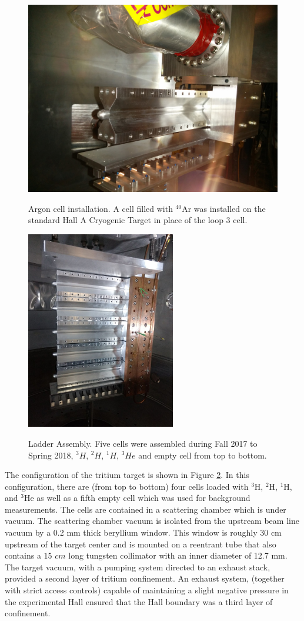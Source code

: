 \documentclass[final,5p,times,twocolumn]{elsarticle}
\begin{document}
\begin{figure}[htbp]
	\centering
	\includegraphics[width=6.5 cm]{images/Ar-cell.jpg}\\
	\caption{Argon cell installation. A cell filled with $^{40}$Ar was installed on the standard Hall A Cryogenic Target in place of the loop 3 cell.}
	\label{argon}
\end{figure}

\begin{figure}[htbp]
  \centering
  \includegraphics[width=6.5cm]{images/ladder.jpg}\\
  \caption{Ladder Assembly. Five cells were assembled during Fall 2017 to Spring 2018, $^{3}H$, $^{2}H$, $^{1}H $, $^{3}He$ and empty cell from top to bottom.}
  \label{ladder}
\end{figure}

The configuration of the tritium target is shown in Figure \ref{ladder}. In this configuration, there are (from top to bottom) four cells loaded with $^{3}$H, $^{2}$H, $^{1}$H, and $^{3}$He as well as a fifth empty cell which was used for background measurements. The cells are contained in a scattering chamber which is under vacuum. The scattering chamber vacuum is isolated from the upstream beam line vacuum by a 0.2 mm thick beryllium window. This window is roughly 30 cm upstream of the target center and is mounted on a reentrant tube that also contains a $15$ $cm$ long tungsten collimator with an inner diameter of 12.7 mm. The target vacuum, with a pumping system directed to an exhaust stack, provided a second layer of tritium confinement. An exhaust system, (together with strict access controls) capable of maintaining a slight negative pressure in the experimental Hall ensured that the Hall boundary was a third layer of confinement.
\end{document}
